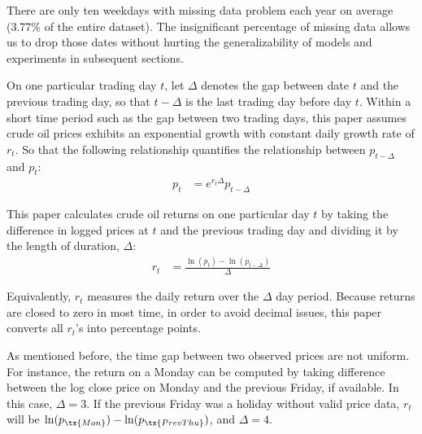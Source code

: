 \documentclass[12pt]{article}
\begin{document}
	\par There are only ten weekdays with missing data problem each year on average (3.77\% of the entire dataset). The insignificant percentage of missing data allows us to drop those dates without hurting the generalizability of models and experiments in subsequent sections.

	\par On one particular trading day $t$, let $\Delta$ denotes the gap between date $t$ and the previous trading day, so that $t - \Delta$ is the last trading day before day $t$. 
	Within a short time period such as the gap between two trading days, this paper assumes crude oil prices exhibits an exponential growth with constant daily growth rate of $r_t$.
	So that the following relationship quantifies the relationship between $p_{t-\Delta}$ and $p_t$:
	\begin{align}
		p_t &= e^{r_t \Delta} p_{t-\Delta}
	\end{align}
	
	\par This paper calculates crude oil returns on one particular day $t$ by taking the difference in logged prices at $t$ and the previous trading day and dividing it by the length of duration, $\Delta$:
	\begin{align}
		r_t &= \frac{\ln(p_t) - \ln(p_{t - \Delta})}{\Delta}
	\end{align}
	
	\par Equivalently, $r_t$ measures the daily return over the $\Delta$ day period. Because returns are closed to zero in most time, in order to avoid decimal issues, this paper converts all $r_t$'s into percentage points.
	
	\par As mentioned before, the time gap between two observed prices are not uniform.
	For instance, the return on a Monday can be computed by taking difference between the log close price on Monday and the previous Friday, if available. In this case, $\Delta = 3$. If the previous Friday was a holiday without valid price data, $r_t$ will be $\ln(p_\tx{Mon}) - \ln(p_{\tx{Prev Thu}})$, and $\Delta = 4$.
\end{document}
